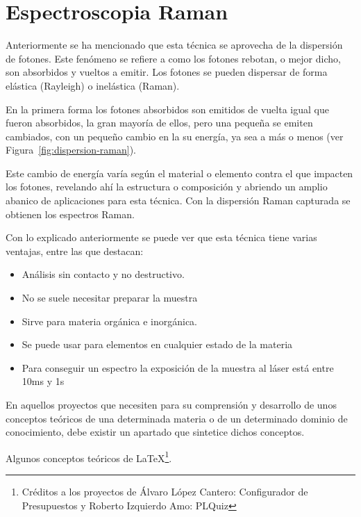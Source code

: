 
\section{Espectroscopia Raman}\label{def:raman}
Anteriormente se ha mencionado que esta técnica se aprovecha de la dispersión de
fotones. Este fenómeno se refiere a como los fotones rebotan, o mejor dicho, son
absorbidos y vueltos a emitir. Los fotones se pueden
dispersar de forma elástica (Rayleigh) o inelástica (Raman).

En la primera forma los fotones absorbidos son emitidos de vuelta igual que
fueron absorbidos, la gran mayoría de ellos, pero una pequeña se emiten
cambiados, con un pequeño cambio en la su energía, ya sea a más o menos (ver
Figura~\ref{fig:dispersion-raman}).

Este cambio de energía varía según el material o elemento contra el que impacten
los fotones, revelando ahí la estructura o composición y abriendo un amplio
abanico de aplicaciones para esta
técnica\cite{what-is-raman,wiki:raman-scatter}. Con la dispersión Raman
capturada se obtienen los espectros Raman.


Con lo explicado anteriormente se puede ver que esta técnica tiene varias
ventajas, entre las que destacan\cite{what-is-raman}:
\begin{itemize}
	\tightlist
	\item Análisis sin contacto y no destructivo.
	\item No se suele necesitar preparar la muestra
	\item Sirve para materia orgánica e inorgánica.
	\item Se puede usar para elementos en cualquier estado de la materia
	\item Para conseguir un espectro la exposición de la muestra al láser está
	entre 10ms y 1s
\end{itemize}

En aquellos proyectos que necesiten para su comprensión y desarrollo de unos
conceptos teóricos de una determinada materia o de un determinado dominio de
conocimiento, debe existir un apartado que sintetice dichos conceptos.

Algunos conceptos teóricos de \LaTeX \footnote{Créditos a los proyectos de
	Álvaro López Cantero: Configurador de Presupuestos y Roberto Izquierdo Amo:
	PLQuiz}.

